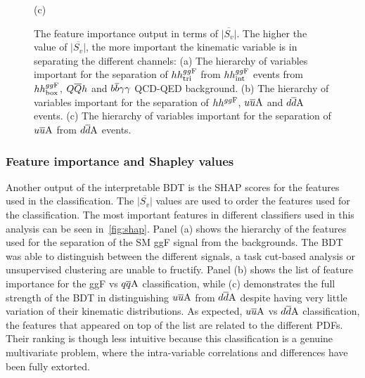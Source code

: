 \begin{figure}[t!]
	{  \footnotesize  (c)}
	\caption{The feature importance output in terms of $\overline{|S_v|}$. The higher the value of $\overline{|S_v|}$, the more important the kinematic variable is in separating the different channels: (a) The hierarchy of variables important for the separation of $hh^{gg\rm F}_{\rm tri}$ from $hh^{gg\rm F}_{\rm int}$ events from $hh^{gg\rm F}_{\rm box}$, $Q\overline Q h$ and $b\overline b\gamma\gamma$ QCD-QED background.  (b) The hierarchy of variables important for the separation of $hh^{gg\rm F}$, $u\overline u \rm A$ and $d\overline d \rm A$ events. (c) The hierarchy of variables important for the separation of $u\overline u \rm A$ from $d\overline d \rm A$ events.}
	\label{fig:shap}
\end{figure}
\subsubsection*{Feature importance and Shapley values}
\par Another output of the interpretable BDT is the SHAP scores for the features used in the classification.  The $\overline{|S_v|}$ values are used to order the features used for the classification. The most important features in different classifiers used in this analysis can be seen in~\autoref{fig:shap}. Panel (a) shows the hierarchy of the features used for the separation of the SM ggF signal from the backgrounds. The BDT was able to distinguish between the different signals, a task cut-based analysis or unsupervised clustering are unable to fructify. Panel (b) shows the list of feature importance for the ggF vs $q\overline q \rm A$ classification, while (c) demonstrates the full strength of the BDT in distinguishing $u\overline u \rm A$ from $d\overline d \rm A$ despite having very little variation of their kinematic distributions.  As expected, $u\overline u \rm A$ vs $d\overline d \rm A$ classification, the features that appeared on top of the list are related to the different PDFs. Their ranking is though less intuitive because this classification is a genuine multivariate problem, where the intra-variable correlations and differences have been fully extorted. 
